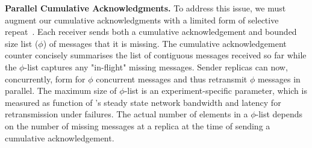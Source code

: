 %
%
%

\par \textbf{Parallel Cumulative Acknowledgments.} 
To address this issue, we must augment our cumulative acknowledgments with a limited form of selective repeat~\cite{selective-repeat}.
Each receiver sends both a cumulative acknowledgement and bounded size list ($\phi$) of messages that it is missing. The cumulative acknowledgement counter concisely summarises the list of contiguous messages received so far while the $\phi$-list captures any "in-flight" missing messages. Sender replicas can now, concurrently, form  for $\phi$ concurrent messages and thus retransmit $\phi$ messages in parallel.  
The maximum size of $\phi$-list is an experiment-specific parameter, which is measured as function of
\Scrooge's steady state network bandwidth and latency for retransmission under failures.
The actual number of elements in a $\phi$-list depends on the number of missing messages at a replica at the time of sending a cumulative acknowledgement.



